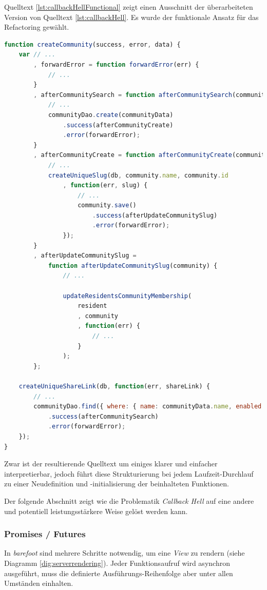 Quelltext \ref{lst:callbackHellFunctional} zeigt einen Ausschnitt der überarbeiteten Version von Quelltext \ref{lst:callbackHell}. Es wurde der funktionale Ansatz für das Refactoring gewählt.

\begin{lstlisting}[language=JavaScript, firstnumber=192, caption={Ausschnitt aus dem neusten Community Controller \cite{masterCommunityController}}, label={lst:callbackHellFunctional}]
function createCommunity(success, error, data) {
	var // ...
		, forwardError = function forwardError(err) {
			// ...
		}
		, afterCommunitySearch = function afterCommunitySearch(community) {
			// ...
			communityDao.create(communityData)
				.success(afterCommunityCreate)
				.error(forwardError);
		}
		, afterCommunityCreate = function afterCommunityCreate(community) {
			// ...
			createUniqueSlug(db, community.name, community.id
				, function(err, slug) {
					// ...
					community.save()
						.success(afterUpdateCommunitySlug)
						.error(forwardError);
				});
		}
		, afterUpdateCommunitySlug =
			function afterUpdateCommunitySlug(community) {
				// ...

				updateResidentsCommunityMembership(
					resident
					, community
					, function(err) {
						// ...
					}
				);
		};

	createUniqueShareLink(db, function(err, shareLink) {
		// ...
		communityDao.find({ where: { name: communityData.name, enabled: true }})
			.success(afterCommunitySearch)
			.error(forwardError);
	});
}
\end{lstlisting}

Zwar ist der resultierende Quelltext um einiges klarer und einfacher interpretierbar, jedoch führt diese Strukturierung bei jedem Laufzeit-Durchlauf zu einer Neudefinition und -initialisierung der beinhalteten Funktionen.

Der folgende Abschnitt zeigt wie die Problematik \emph{Callback Hell} auf eine andere und potentiell leistungsstärkere Weise gelöst werden kann.


\subsubsection*{Promises / Futures}

In \emph{barefoot} sind mehrere Schritte notwendig, um eine \emph{View} zu rendern (siehe Diagramm \ref{dig:serverrendering}).
Jeder Funktionsaufruf wird asynchron ausgeführt, muss die definierte Ausführungs-Reihenfolge aber unter allen Umständen einhalten.

